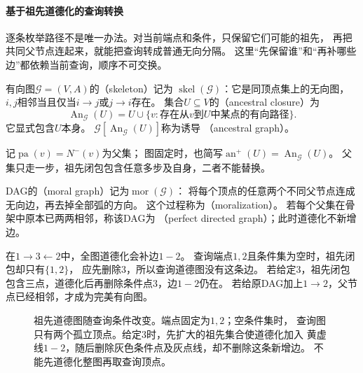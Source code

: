 \paragraph{基于祖先道德化的查询转换}
\label{sec:graph-theory-directed-transformations}

逐条枚举路径不是唯一办法。对当前端点和条件，只保留它们可能的祖先，
再把共同父节点连起来，就能把查询转成普通无向分隔。
这里“先保留谁”和“再补哪些边”都依赖当前查询，顺序不可交换。

\begin{definition}[骨架、祖先闭包与诱导祖先图]
  \label{def:graph-theory-directed-structure}
  有向图\(\mathcal G=(V,A)\)的（skeleton）记为
  \(\operatorname{skel}(\mathcal G)\)：它是同顶点集上的无向图，
  \(i,j\)相邻当且仅当\(i\to j\)或\(j\to i\)存在。
  集合\(U\subseteq V\)的（ancestral closure）为
  \[
    \operatorname{An}_{\mathcal G}(U)
    =U\cup\{v:\text{存在从\(v\)到\(U\)中某点的有向路径}\}.
  \]
  它显式包含\(U\)本身。
  \(\mathcal G[\operatorname{An}_{\mathcal G}(U)]\)称为诱导
  （ancestral graph）。
\end{definition}

记\(\operatorname{pa}(v)=N^-(v)\)为父集；
图固定时，也简写\(\operatorname{an}^{+}(U)=\operatorname{An}_{\mathcal G}(U)\)。
父集只走一步，祖先闭包包含任意多步及自身，二者不能替换。

\begin{definition}[道德图与完美有向图]
  \label{def:graph-theory-moral-perfect}
  DAG的（moral graph）记为\(\operatorname{mor}(\mathcal G)\)：
  将每个顶点的任意两个不同父节点连成无向边，再去掉全部弧的方向。
  这个过程称为（moralization）。
  若每个父集在骨架中原本已两两相邻，称该DAG为
  （perfect directed graph）；此时道德化不新增边。
\end{definition}

在\(1\to3\leftarrow2\)中，全图道德化会补边\(1-2\)。
查询端点\(1,2\)且条件集为空时，祖先闭包却只有\(\{1,2\}\)，
应先删除\(3\)，所以查询道德图没有这条边。
若给定\(3\)，祖先闭包包含三点，道德化后再删除条件点\(3\)，边\(1-2\)仍在。
若给原DAG加上\(1\to2\)，父节点已经相邻，才成为完美有向图。

\begin{figure}[htbp]
  \centering
  
  \caption{祖先道德图随查询条件改变。端点固定为\(1,2\)；空条件集时，
  查询图只有两个孤立顶点。给定\(3\)时，先扩大的祖先集合使道德化加入
  黄虚线\(1-2\)，随后删除灰色条件点及灰点线，却不删除这条新增边。
  不能先道德化整图再取查询顶点。}
  \label{fig:graph-theory-ancestor-moral-query}
\end{figure}

